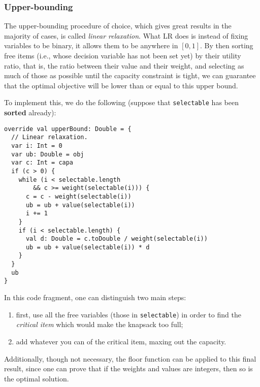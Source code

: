 \documentclass[journal]{IEEEtran}
\newcommand{\scala}[1]{\texttt{#1}}
\begin{document}
\subsubsection{Upper-bounding}
The upper-bounding procedure of choice, which gives great results in the majority of cases, is called \emph{linear relaxation}.
What LR does is instead of fixing variables to be binary, it allows them to be anywhere in \([0, 1]\).
By then sorting free items (i.e., whose decision variable has not been set yet) by their utility ratio, that is, the ratio between their value and their weight, and selecting as much of those as possible until the capacity constraint is tight, we can guarantee that the optimal objective will be lower than or equal to this upper bound.

To implement this, we do the following (suppose that \scala{selectable} has been \textbf{sorted} already):
\begin{verbatim}
override val upperBound: Double = {
  // Linear relaxation.
  var i: Int = 0
  var ub: Double = obj
  var c: Int = capa
  if (c > 0) {
    while (i < selectable.length
        && c >= weight(selectable(i))) {
      c = c - weight(selectable(i))
      ub = ub + value(selectable(i))
      i += 1
    }
    if (i < selectable.length) {
      val d: Double = c.toDouble / weight(selectable(i))
      ub = ub + value(selectable(i)) * d
    }
  }
  ub
}
\end{verbatim}
In this code fragment, one can distinguish two main steps:
\begin{enumerate}
	\item first, use all the free variables (those in \scala{selectable}) in order to find the \emph{critical item} which would make the knapsack too full;
	\item add whatever you can of the critical item, maxing out the capacity.
\end{enumerate}

Additionally, though not necessary, the floor function can be applied to this final result, since one can prove that if the weights and values are integers, then so is the optimal solution.
\end{document}
